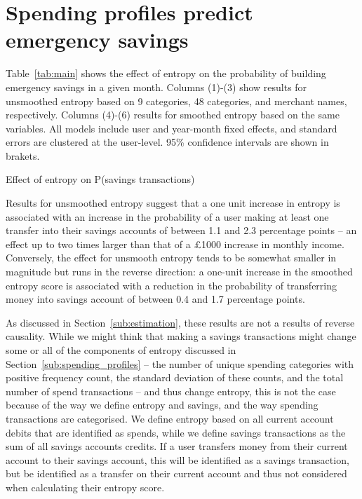 
\section{Spending profiles predict emergency savings}%
\label{sec:results}

Table~\ref{tab:main} shows the effect of entropy on the
probability of building emergency savings in a given month. Columns (1)-(3)
show results for unsmoothed entropy based on 9 categories, 48 categories, and
merchant names, respectively. Columns (4)-(6) results for smoothed entropy
based on the same variables. All models include user and year-month fixed
effects, and standard errors are clustered at the user-level. 95\% confidence
intervals are shown in brakets.

\begin{table}[ht]
\centering\tiny
\caption{Effect of entropy on P(savings transactions)}
\label{tab:main}

\end{table}

Results for unsmoothed entropy suggest that a one unit increase in entropy is
associated with an increase in the probability of a user making at least one
transfer into their savings accounts of between 1.1 and 2.3 percentage points
-- an effect up to two times larger than that of a \pounds1000 increase in
monthly income. Conversely, the effect for unsmooth entropy tends to be
somewhat smaller in magnitude but runs in the reverse direction: a one-unit
increase in the smoothed entropy score is associated with a reduction in the
probability of transferring money into savings account of between 0.4 and 1.7
percentage points.

As discussed in Section~\ref{sub:estimation}, these results are not a results
of reverse causality. While we might think that making a savings transactions
might change some or all of the components of entropy discussed in
Section~\ref{sub:spending_profiles} -- the number of unique spending categories
with positive frequency count, the standard deviation of these counts, and the
total number of spend transactions -- and thus change entropy, this is not the
case because of the way we define entropy and savings, and the way spending
transactions are categorised. We define entropy based on all current account
debits that are identified as spends, while we define savings transactions as
the sum of all savings accounts credits. If a user transfers money from their
current account to their savings account, this will be identified as a savings
transaction, but be identified as a transfer on their current account and thus
not considered when calculating their entropy score.

